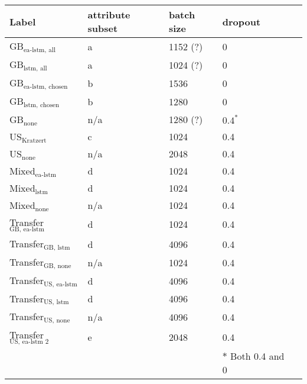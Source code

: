 \begin{tabular}{lllll}
    \toprule
    Label & attribute subset & batch size & dropout \\
    \midrule
    GB$_\text{ea-lstm, all}$ & a &  1152 (?)  & 0\\
    GB$_\text{lstm, all}$ & a & 1024 (?) & 0  \\
    GB$_\text{ea-lstm, chosen}$ & b & 1536 & 0 \\
    GB$_\text{lstm, chosen}$ & b & 1280 & 0\\
    GB$_\text{none}$ & n/a & 1280 (?) & $0.4^*$\\
    US$_\text{Kratzert}$  & c & 1024 & 0.4 \\
    US$_\text{none}$  & n/a & 2048 & 0.4\\
    Mixed$_\text{ea-lstm}$ & d & 1024 & 0.4\\
    Mixed$_\text{lstm}$ & d & 1024 & 0.4\\
    Mixed$_\text{none}$ & n/a & 1024 & 0.4\\
    Transfer$_\text{GB, ea-lstm}$ & d  & 1024 & 0.4 \\
    Transfer$_\text{GB, lstm}$ & d  & 4096 & 0.4\\
    Transfer$_\text{GB, none}$ & n/a & 1024 & 0.4 \\
    Transfer$_\text{US, ea-lstm}$ & d & 4096 & 0.4 \\
    Transfer$_\text{US, lstm}$  & d & 4096 & 0.4 \\ 
    Transfer$_\text{US, none}$  & n/a & 4096 & 0.4 \\
    Transfer$_\text{US, ea-lstm 2}$ & e & 2048 & 0.4 \\
    & & & $*$ Both 0.4 and 0

\end{tabular}
